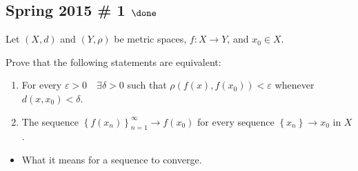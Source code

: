 \hypertarget{spring-2015-1-done}{%
\subsection{\texorpdfstring{Spring 2015 \# 1
\(\done\)}{Spring 2015 \# 1 \textbackslash done}}\label{spring-2015-1-done}}

Let \((X, d)\) and \((Y, \rho)\) be metric spaces, \(f: X\to Y\), and
\(x_0 \in X\).

Prove that the following statements are equivalent:

\begin{enumerate}
\def\labelenumi{\arabic{enumi}.}
\tightlist
\item
  For every \(\varepsilon > 0 \quad \exists \delta > 0\) such that
  \(\rho( f(x), f(x_0) ) < \varepsilon\) whenever
  \(d(x, x_0) < \delta\).
\item
  The sequence \(\left\{{f(x_n)}\right\}_{n=1}^\infty \to f(x_0)\) for
  every sequence \(\left\{{x_n}\right\} \to x_0\) in \(X\).
\end{enumerate}

\begin{concept}

\envlist

\begin{itemize}
\tightlist
\item
  What it means for a sequence to converge.
\end{itemize}

\end{concept}

